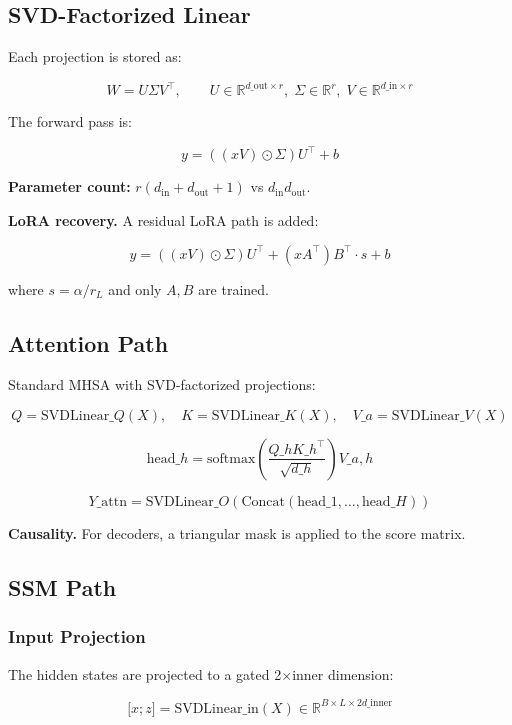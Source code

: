 \subsection{SVD-Factorized Linear}

Each projection is stored as:

\[
W = U \Sigma V^\top, \qquad
U \in \mathbb{R}^{d\_\text{out} \times r}, \; \Sigma \in \mathbb{R}^r, \;
V \in \mathbb{R}^{d\_\text{in} \times r}
\tag{4.1}
\]

The forward pass is:

\[
y = ((x V) \odot \Sigma) U^\top + b
\tag{4.2}
\]

\textbf{Parameter count:} $r(d_\text{in} + d_\text{out} + 1)$ vs $d_\text{in} d_\text{out}$.

\textbf{LoRA recovery.} A residual LoRA path is added:

\[
y = ((x V) \odot \Sigma) U^\top + (x A^\top) B^\top \cdot s + b
\tag{4.3}
\]

where $s = \alpha / r_L$ and only $A, B$ are trained.

\subsection{Attention Path}

Standard MHSA with SVD-factorized projections:

\[
Q = \text{SVDLinear}\_Q(X), \quad
K = \text{SVDLinear}\_K(X), \quad
V\_a = \text{SVDLinear}\_V(X)
\tag{4.4}
\]

\[
\text{head}\_h = \text{softmax}\!\left(\frac{Q\_h K\_h^\top}{\sqrt{d\_h}}\right) V\_{a,h}
\tag{4.5}
\]

\[
Y\_\text{attn} = \text{SVDLinear}\_O(\text{Concat}(\text{head}\_1, \dots, \text{head}\_H))
\tag{4.6}
\]

\textbf{Causality.} For decoders, a triangular mask is applied to the score 
matrix.

\subsection{SSM Path}

\subsubsection{Input Projection}

The hidden states are projected to a gated 2$\times$inner dimension:

\[
{[}x; z] = \text{SVDLinear}\_\text{in}(X) \in \mathbb{R}^{B \times L \times 2 d\_\text{inner}}
\tag{4.7}
\]

